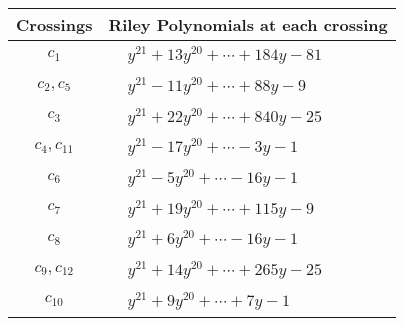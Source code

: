 \documentclass[1p]{elsarticle_modified}
\theoremstyle{definition}
\begin{document}
\begin{tabular}{m{50pt}|m{274pt}}
Crossings & \hspace{64pt}Riley Polynomials at each crossing \\
\hline $$\begin{aligned}c_{1}\end{aligned}$$&$\begin{aligned}
&y^{21}+13 y^{20}+\cdots+184 y-81
\end{aligned}$\\
\hline $$\begin{aligned}c_{2},c_{5}\end{aligned}$$&$\begin{aligned}
&y^{21}-11 y^{20}+\cdots+88 y-9
\end{aligned}$\\
\hline $$\begin{aligned}c_{3}\end{aligned}$$&$\begin{aligned}
&y^{21}+22 y^{20}+\cdots+840 y-25
\end{aligned}$\\
\hline $$\begin{aligned}c_{4},c_{11}\end{aligned}$$&$\begin{aligned}
&y^{21}-17 y^{20}+\cdots-3 y-1
\end{aligned}$\\
\hline $$\begin{aligned}c_{6}\end{aligned}$$&$\begin{aligned}
&y^{21}-5 y^{20}+\cdots-16 y-1
\end{aligned}$\\
\hline $$\begin{aligned}c_{7}\end{aligned}$$&$\begin{aligned}
&y^{21}+19 y^{20}+\cdots+115 y-9
\end{aligned}$\\
\hline $$\begin{aligned}c_{8}\end{aligned}$$&$\begin{aligned}
&y^{21}+6 y^{20}+\cdots-16 y-1
\end{aligned}$\\
\hline $$\begin{aligned}c_{9},c_{12}\end{aligned}$$&$\begin{aligned}
&y^{21}+14 y^{20}+\cdots+265 y-25
\end{aligned}$\\
\hline $$\begin{aligned}c_{10}\end{aligned}$$&$\begin{aligned}
&y^{21}+9 y^{20}+\cdots+7 y-1
\end{aligned}$\\
\hline
\end{tabular}\\~\\
\end{document}

